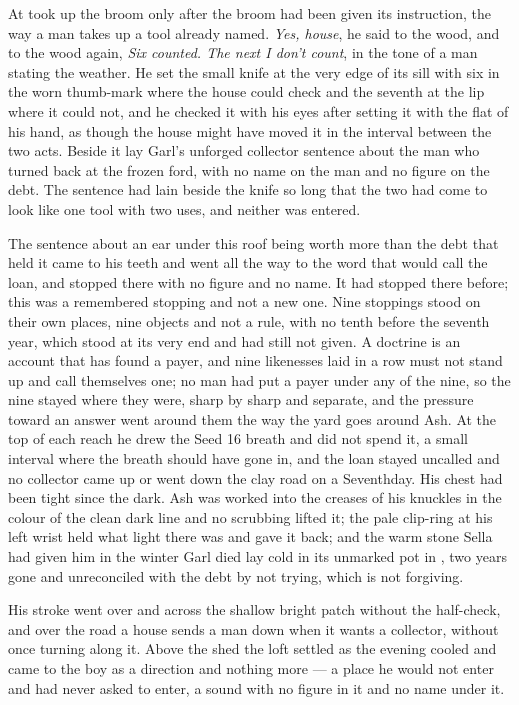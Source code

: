 At   took up the broom only after the broom had been given its instruction, the way a man takes up a tool already named. \emph{Yes, house}, he said to the wood, and to the wood again, \emph{Six counted. The next I don’t count}, in the tone of a man stating the weather. He set the small knife at the very edge of its sill with six in the worn thumb-mark where the house could check and the seventh at the lip where it could not, and he checked it with his eyes after setting it with the flat of his hand, as though the house might have moved it in the interval between the two acts. Beside it lay Garl's unforged collector sentence about the man who turned back at the frozen ford, with no name on the man and no figure on the debt. The sentence had lain beside the knife so long that the two had come to look like one tool with two uses, and neither was entered.

The sentence about an ear under this roof being worth more than the debt that held it came to his teeth and went all the way to the word that would call the loan, and stopped there with no figure and no name. It had stopped there before; this was a remembered stopping and not a new one. Nine stoppings stood on their own places, nine objects and not a rule, with no tenth before the seventh year, which stood at its very end and had still not given. A doctrine is an account that has found a payer, and nine likenesses laid in a row must not stand up and call themselves one; no man had put a payer under any of the nine, so the nine stayed where they were, sharp by sharp and separate, and the pressure toward an answer went around them the way the yard goes around Ash. At the top of each reach he drew the Seed 16 breath and did not spend it, a small interval where the breath should have gone in, and the loan stayed uncalled and no collector came up or went down the clay road on a Seventhday. His chest had been tight since the dark. Ash was worked into the creases of his knuckles in the colour of the clean dark line and no scrubbing lifted it; the pale clip-ring at his left wrist held what light there was and gave it back; and the warm stone Sella had given him in the winter Garl died lay cold in its unmarked pot in , two years gone and unreconciled with the debt by not trying, which is not forgiving.

His stroke went over  and across the shallow bright patch without the half-check, and over the road a house sends a man down when it wants a collector, without once turning along it. Above the shed the loft settled as the evening cooled and came to the boy as a direction and nothing more --- a place he would not enter and had never asked to enter, a sound with no figure in it and no name under it.

